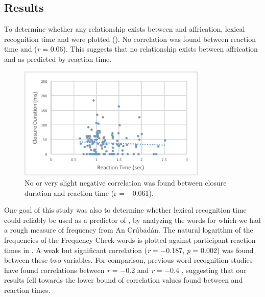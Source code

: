 \documentclass[output=paper,newtxmath,modfonts,nonflat,final]{langsci/langscibook}
\begin{document}
\subsection{Results}\label{sec:moeng:6.3}

To determine whether any relationship exists between  and affrication, lexical recognition time and  were plotted (). No correlation was found between reaction time and  (\textit{r} = 0.06). This suggests that no relationship exists between affrication and  as predicted by reaction time.

\begin{figure}
\includegraphics[width=0.8\textwidth]{figures/fig-moeng-5}
\caption{No or very slight negative correlation was found between closure duration and reaction time (r = −0.061).}
\label{fig:moeng:6}
\end{figure}

One goal of this study was also to determine whether lexical recognition time could reliably be used as a predictor of , by analyzing the words for which we had a rough measure of frequency from An Crúbadán. The natural logarithm of the frequencies of the Frequency Check words is plotted against participant reaction times in . A weak but significant correlation (\textit{r} = −0.187, \textit{p} = 0.002) was found between these two variables. For comparison, previous word recognition studies have found correlations between \textit{r} = −0.2 and \textit{r} = −0.4 \citep{brysbaert2011word}, suggesting that our results fell towards the lower bound of correlation values found between  and reaction times.

   
\end{document}

